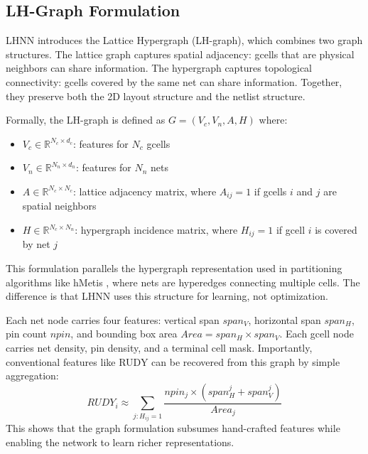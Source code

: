 \documentclass[sigconf]{acmart}
\begin{document}
\subsection{LH-Graph Formulation}

LHNN introduces the Lattice Hypergraph (LH-graph), which combines two 
graph structures. The lattice graph captures spatial adjacency: gcells 
that are physical neighbors can share information. The hypergraph 
captures topological connectivity: gcells covered by the same net can 
share information. Together, they preserve both the 2D layout structure 
and the netlist structure.

Formally, the LH-graph is defined as $G = (V_c, V_n, A, H)$ where:
\begin{itemize}
    \item $V_c \in \mathbb{R}^{N_c \times d_c}$: features for $N_c$ gcells
    \item $V_n \in \mathbb{R}^{N_n \times d_n}$: features for $N_n$ nets
    \item $A \in \mathbb{R}^{N_c \times N_c}$: lattice adjacency matrix, 
          where $A_{ij} = 1$ if gcells $i$ and $j$ are spatial neighbors
    \item $H \in \mathbb{R}^{N_c \times N_n}$: hypergraph incidence matrix, 
          where $H_{ij} = 1$ if gcell $i$ is covered by net $j$
\end{itemize}

This formulation parallels the hypergraph representation used in 
partitioning algorithms like hMetis \cite{karypis1999hmetis}, where nets are hyperedges 
connecting multiple cells. The difference is that LHNN uses this 
structure for learning, not optimization.

Each net node carries four features: vertical span $span_V$, horizontal 
span $span_H$, pin count $npin$, and bounding box area $Area = span_H 
\times span_V$. Each gcell node carries net density, pin density, and 
a terminal cell mask. Importantly, conventional features like RUDY can 
be recovered from this graph by simple aggregation:
\begin{equation}
RUDY_i \approx \sum_{j: H_{ij}=1} \frac{npin_j \times (span_H^j + span_V^j)}{Area_j}
\end{equation}
This shows that the graph formulation subsumes hand-crafted features 
while enabling the network to learn richer representations.
\end{document}
